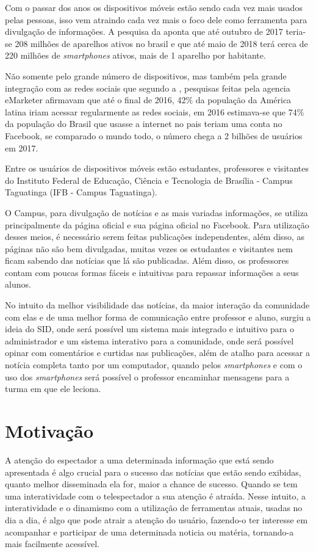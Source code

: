 Com o passar dos anos os dispositivos móveis estão sendo cada vez mais usados pelas pessoas, isso vem atraindo cada vez mais o foco dele como ferramenta para divulgação de informações. A pesquisa da \cite{fgv2017} aponta que até outubro de 2017 teria-se 208 milhões de aparelhos ativos no brasil e que até maio de 2018 terá cerca de 220 milhões de \textit{smartphones} ativos, mais de 1 aparelho por habitante. 

Não somente pelo grande número de dispositivos, mas também pela grande integração com as redes sociais que segundo a \cite{forbes2016}, pesquisas feitas pela agencia eMarketer afirmavam que até o final de 2016, 42\% da população da América latina iriam acessar regularmente as redes sociais, em 2016 estimava-se que 74\% da população do Brasil que usasse a internet no pais teriam uma conta no Facebook, se comparado o mundo todo, o número chega a 2 bilhões de usuários em 2017. 

Entre os usuários de dispositivos móveis estão estudantes, professores e visitantes do Instituto Federal de Educação, Ciência e Tecnologia de Brasília - Campus Taguatinga (IFB - Campus Taguatinga). 

O Campus, para divulgação de notícias e as mais variadas informações, se utiliza principalmente da página oficial e sua página oficial no Facebook. Para utilização desses meios, é necessário serem feitas publicações independentes, além disso, as páginas não são bem divulgadas, muitas vezes os estudantes e visitantes nem ficam sabendo das notícias que lá são publicadas. Além disso, os professores contam com poucas formas fáceis e intuitivas para repassar informações a seus alunos.

No intuito da melhor visibilidade das notícias, da maior interação da comunidade com elas e de uma melhor forma de comunicação entre professor e aluno, surgiu a ideia do SID, onde será possível um sistema mais integrado e intuitivo para o administrador e um sistema interativo para a comunidade, onde será possível opinar com comentários e curtidas nas publicações, além de atalho para acessar a notícia completa tanto por um computador, quando pelos \textit{smartphones} e com o uso dos \textit{smartphones} será possível o professor encaminhar mensagens para a turma em que ele leciona. 

\section{Motivação}
A atenção do espectador a uma determinada informação que está sendo apresentada é algo crucial para o sucesso das notícias que estão sendo exibidas, quanto melhor disseminada ela for, maior a chance de sucesso. Quando se tem uma interatividade com o telespectador a sua atenção é atraída. Nesse intuito, a interatividade e o dinamismo com a utilização de ferramentas atuais, usadas no dia a dia, é algo que pode atrair a atenção do usuário, fazendo-o ter interesse em acompanhar e participar de uma determinada noticia ou matéria, tornando-a mais facilmente acessível. 

